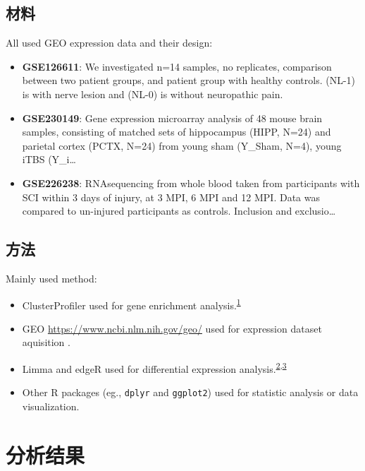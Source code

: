 \documentclass[
]{article}
\providecommand{\tightlist}{%
  \setlength{\itemsep}{0pt}\setlength{\parskip}{0pt}}
\begin{document}
\hypertarget{ux6750ux6599}{%
\subsection{材料}\label{ux6750ux6599}}

All used GEO expression data and their design:

\begin{itemize}
\item
  \textbf{GSE126611}: We investigated n=14 samples, no replicates, comparison between two patient groups, and patient group with healthy controls. (NL-1) is with nerve lesion and (NL-0) is without neuropathic pain.
\item
  \textbf{GSE230149}: Gene expression microarray analysis of 48 mouse brain samples, consisting of matched sets of hippocampus (HIPP, N=24) and parietal cortex (PCTX, N=24) from young sham (Y\_Sham, N=4), young iTBS (Y\_i\ldots{}
\item
  \textbf{GSE226238}: RNAsequencing from whole blood taken from participants with SCI within 3 days of injury, at 3 MPI, 6 MPI and 12 MPI. Data was compared to un-injured participants as controls. Inclusion and exclusio\ldots{}
\end{itemize}

\hypertarget{ux65b9ux6cd5}{%
\subsection{方法}\label{ux65b9ux6cd5}}

Mainly used method:

\begin{itemize}
\tightlist
\item
  ClusterProfiler used for gene enrichment analysis.\textsuperscript{\protect\hyperlink{ref-ClusterprofilerWuTi2021}{1}}
\item
  GEO \url{https://www.ncbi.nlm.nih.gov/geo/} used for expression dataset aquisition .
\item
  Limma and edgeR used for differential expression analysis.\textsuperscript{\protect\hyperlink{ref-LimmaPowersDiRitchi2015}{2},\protect\hyperlink{ref-EdgerDifferenChen}{3}}
\item
  Other R packages (eg., \texttt{dplyr} and \texttt{ggplot2}) used for statistic analysis or data visualization.
\end{itemize}

\hypertarget{results}{%
\section{分析结果}\label{results}}
\end{document}
